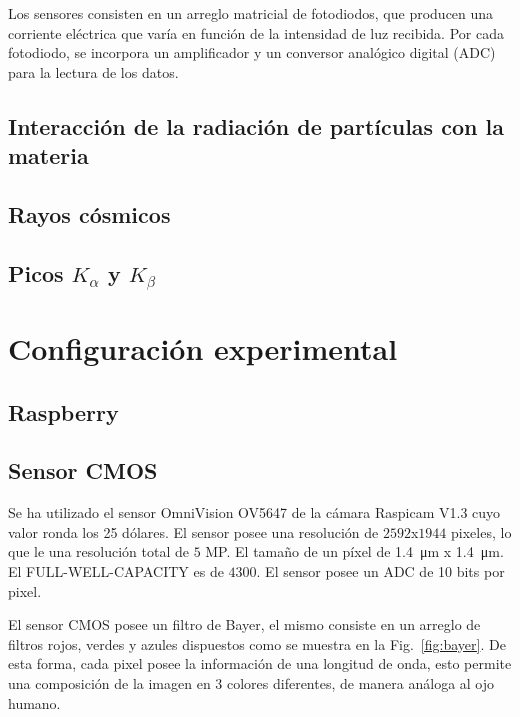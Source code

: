     Los sensores consisten en un arreglo matricial de fotodiodos, 
    que producen una corriente eléctrica que varía en función de la intensidad de luz recibida.
    Por cada fotodiodo, se incorpora un amplificador y un conversor analógico digital (ADC) para la lectura de los datos.
  

    \subsection{Interacción de la radiación de partículas con la materia}

    \subsection{Rayos cósmicos}
    
    \subsection{Picos $K_{\alpha}$ y $K_{\beta}$}


    \section{Configuración experimental}

    \subsection{Raspberry}

    \subsection{Sensor CMOS}
    Se ha utilizado el sensor OmniVision OV5647 de la cámara Raspicam V1.3 cuyo valor ronda los 25 dólares.
    El sensor posee una resolución de	$2592$x$1944$ pixeles, lo que le una resolución total de $5$ MP.
    El tamaño de un píxel de \SI{1.4}{\micro\meter} x \SI{1.4}{\micro\meter}.
    El FULL-WELL-CAPACITY es de $4300$.
    El sensor posee un ADC de 10 bits por pixel.

    El sensor CMOS posee un filtro de Bayer, el mismo consiste en un arreglo de filtros rojos, verdes y azules
    dispuestos como se muestra en la Fig.~\ref{fig:bayer}. De esta forma, cada pixel posee la información de una longitud de onda,
    esto permite una composición de la imagen en 3 colores diferentes, de manera análoga al ojo humano.

